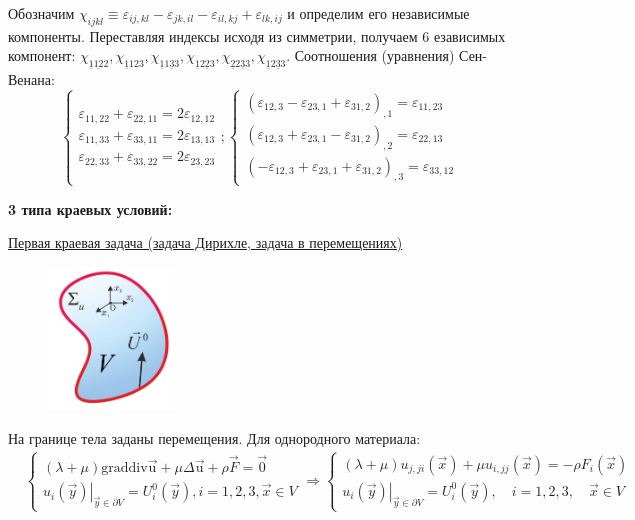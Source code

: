 Обозначим $\chi_{i j k l} \equiv \varepsilon_{i j, k l}-\varepsilon_{j k, i l}-\varepsilon_{i l, k j}+\varepsilon_{l k, i j}$ и определим его независимые компоненты. Переставляя индексы исходя из симметрии, получаем 6 езависимых компонент: $\chi_{\underline{1} \underline{12} 2}, \chi_{\underline{1} 123}, \chi_{\underline{1} 1 \underline{3} 3}, \chi_{\underline{1} 2 \underline{2} 3}, \chi_{\underline{2} 2 \underline{3} 3}, \chi_{\underline{1} 2 \underline{3} 3}$.
Соотношения
(уравнения)
Сен-Венана:
$$
\left\{\begin{array}{l}
\varepsilon_{11,22}+\varepsilon_{22,11}=2 \varepsilon_{12,12} \\
\varepsilon_{11,33}+\varepsilon_{33,11}=2 \varepsilon_{13,13} \\
\varepsilon_{22,33}+\varepsilon_{33,22}=2 \varepsilon_{23,23}
\end{array} ;\left\{\begin{array}{l}
\left(\varepsilon_{12,3}-\varepsilon_{23,1}+\varepsilon_{31,2}\right)_{, 1}=\varepsilon_{11,23} \\
\left(\varepsilon_{12,3}+\varepsilon_{23,1}-\varepsilon_{31,2}\right)_{, 2}=\varepsilon_{22,13} \\
\left(-\varepsilon_{12,3}+\varepsilon_{23,1}+\varepsilon_{31,2}\right)_{, 3}=\varepsilon_{33,12}
\end{array}\right.\right.
$$

\textbf{3 типа краевых условий:}


\underline{Первая краевая задача (задача Дирихле, задача в перемещениях)}
\begin{figure}[h!]
  \centering
  \includegraphics[width=0.3\textwidth]{images/13.2.jpg}
\end{figure}

На границе тела заданы перемещения. Для однородного материала:
$$\displaystyle
\begin{aligned} & \left\{\begin{array}{l}(\lambda+\mu) \mathrm{grad} \mathrm{div} \overrightarrow{\mathrm{u}}+\mu \Delta \overrightarrow{\mathrm{u}}+\rho \vec{F}=\overrightarrow{0} \\ \left.u_i(\vec{y})\right|_{\vec{y} \in \partial V}=U_i^0(\vec{y}), i=1,2,3, \vec{x} \in V\end{array}\right. \Rightarrow \left\{\begin{array}{l}(\lambda+\mu) u_{j, j i}(\vec{x})+\mu u_{i, j j}(\vec{x})=-\rho F_i(\vec{x}) \\ \left.u_i(\vec{y})\right|_{\vec{y} \in \partial V}=U_i^0(\vec{y}), \quad i=1,2,3, \quad \vec{x} \in V\end{array}\right.\end{aligned}$$

